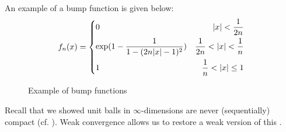 \documentclass{article}
\begin{document}
\begin{unexaminable}
%   
An example of a bump function is given below:
\begin{equation}
f_n(x)=
\left\{
\begin{aligned}
&0 &|x|<\frac{1}{2n}\\
&{\rm exp}(1-\frac{1}{1-(2n|x|-1)^2}) &\frac{1}{2n}<|x|<\frac{1}{n}\\
&1 &\frac{1}{n}<|x|\leq1\\
\end{aligned}
\right.
\end{equation}


\begin{figure}[H]
  \centering
  \caption{Example of bump functions}
\end{figure} 



\end{unexaminable}

Recall that we showed unit balls in $\infty$-dimensions are never (sequentially) compact (cf. ). Weak convergence allows us to restore a weak version of this .  
\end{document}
